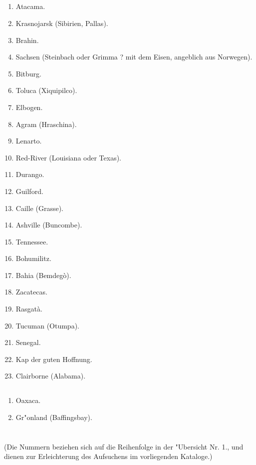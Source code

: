 \documentclass[a4paper, 11pt, oneside, polutonikogreek, german]{article}
\begin{document}
\subsection{}
\begin{enumerate}
    \item Atacama.
    \item Krasnojarsk (Sibirien, Pallas).
    \item Brahin.
    \item Sachsen (Steinbach oder Grimma ? mit dem Eisen, angeblich aus Norwegen).
    \item Bitburg.
    \item Toluca (Xiquipilco).
    \item Elbogen.
    \item Agram (Hraschina).
    \item Lenarto.
    \item Red-River (Louisiana oder Texas).
    \item Durango.
    \item Guilford.
    \item Caille (Grasse).
    \item Ashville (Buncombe).
    \item Tennessee.
    \item Bohumilitz.
    \item Bahia (Bemdegò).
    \item Zacatecas.
    \item Rasgatà.
    \item Tucuman (Otumpa).
    \item Senegal.
    \item Kap der guten Hoffnung.
    \item Clairborne (Alabama).
\end{enumerate}
\subsection{}
\begin{enumerate}
    
    \item Oaxaca.
    \item Gr"onland (Baffingsbay).
\end{enumerate}
\clearpage
\section{}
\begin{center}

(Die Nummern beziehen sich auf die Reihenfolge in der "Ubersicht Nr. 1., und dienen zur Erleichterung des Aufsuchens im vorliegenden Kataloge.)
\end{center}
\end{document}

